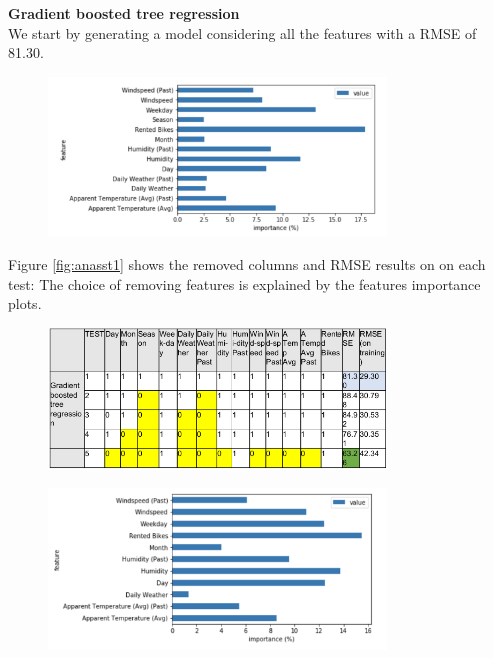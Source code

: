 \textbf{Gradient boosted tree regression}\\
We start by generating a model considering all the features with a RMSE of 81.30.
\begin{figure}[H]
\centering
\includegraphics[width=0.8\textwidth]{media/test1_gb}\label{fig:test1_gb}
\label{fig:test1_gb}
\end{figure}
Figure \ref{fig:anasst1} shows the removed columns and RMSE results on on each test:
The choice of removing features is explained by the features importance plots.
\begin{figure}[H]
\centering
\includegraphics[width=0.8\textwidth]{media/anasst3}\label{fig:anasst3}
\label{fig:anasst3}
\end{figure}
\begin{figure}[H]
\centering
\includegraphics[width=0.8\textwidth]{media/test2_gb}\label{fig:test2_gb}
\label{fig:test2_gb}
\end{figure}
